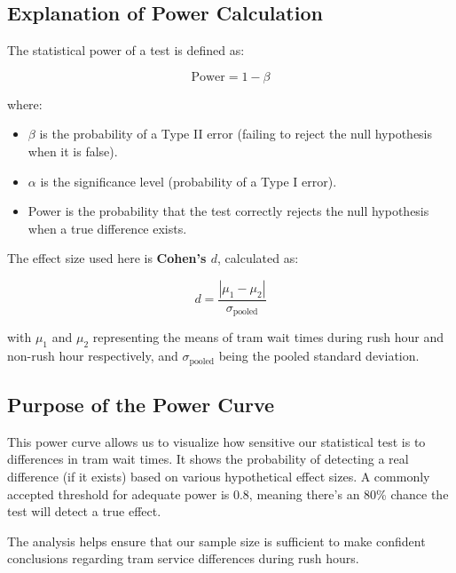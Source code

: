 \documentclass[a4paper, 10pt]{article}
\begin{document}
		\subsection*{Explanation of Power Calculation}

			The statistical power of a test is defined as:

			\[
			\text{Power} = 1 - \beta
			\]

			where:
			\begin{itemize}
					\item \( \beta \) is the probability of a Type II error (failing to reject the null hypothesis when it is false).
					\item \( \alpha \) is the significance level (probability of a Type I error).
					\item Power is the probability that the test correctly rejects the null hypothesis when a true difference exists.
			\end{itemize}

			The effect size used here is \textbf{Cohen's \( d \)}, calculated as:

			\[
			d = \frac{|\mu_1 - \mu_2|}{\sigma_{\text{pooled}}}
			\]

			with \( \mu_1 \) and \( \mu_2 \) representing the means of tram wait times during rush hour and non-rush hour respectively, and \( \sigma_{\text{pooled}} \) being the pooled standard deviation.

		\subsection*{Purpose of the Power Curve}

			This power curve allows us to visualize how sensitive our statistical test is to differences in tram wait times. It shows the probability of detecting a real difference (if it exists) based on various hypothetical effect sizes. A commonly accepted threshold for adequate power is 0.8, meaning there's an 80\% chance the test will detect a true effect.

			\bigskip
			The analysis helps ensure that our sample size is sufficient to make confident conclusions regarding tram service differences during rush hours.
\end{document}
